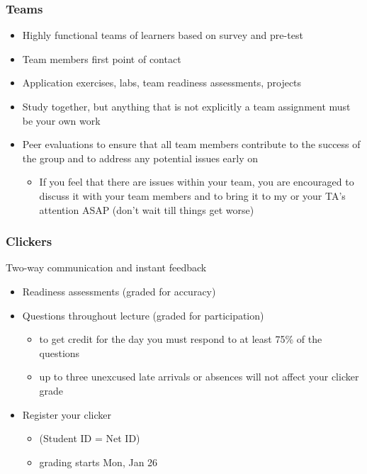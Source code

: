 \documentclass[11pt,containsverbatim,handout,xcolor=xelatex,dvipsnames,table]{beamer}
\begin{document}

\begin{frame}
\frametitle{Teams}

\begin{itemize}
\item Highly functional teams of learners based on survey and pre-test

\item Team members first point of contact

\item Application exercises, labs, team readiness assessments, projects

\item Study together, but anything that is not explicitly a team assignment must be your own work

\item Peer evaluations to ensure that all team members contribute to the success of the group and to address any potential issues early on
\begin{itemize}
\item If you feel that there are issues within your team, you are encouraged to discuss it with your team members and to bring it to my or your TA's attention ASAP (don't wait till things get worse)
\end{itemize}

\end{itemize}

\end{frame}


\begin{frame}
\frametitle{Clickers}

 Two-way communication and instant feedback

\begin{itemize}
\item Readiness assessments (graded for accuracy)

\item Questions throughout lecture (graded for participation)
\begin{itemize}
\item to get credit for the day you must respond to at least 75\% of the questions
\item up to three unexcused late arrivals or absences will not affect your clicker grade
\end{itemize}

\item Register your clicker
\begin{itemize}
\item {} (Student ID = Net ID)
\item grading starts Mon, Jan 26
\end{itemize}

\end{itemize}

\end{frame}
\end{document}
